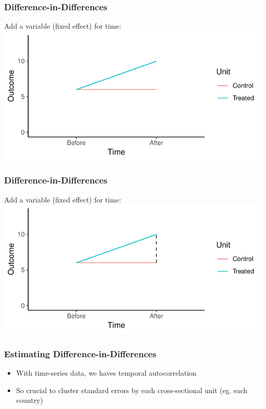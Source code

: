 \documentclass[xcolor=x11names,compress]{beamer}\usepackage[]{graphicx}\usepackage[]{color}
\makeatletter
\def\maxwidth{ %
  \ifdim\Gin@nat@width>\linewidth
    \linewidth
  \else
    \Gin@nat@width
  \fi
}
\newenvironment{knitrout}{}{} %
\renewcommand{\(}{\begin{columns}}
\renewcommand{\)}{\end{columns}}
\newcommand{\<}[1]{\begin{column}{#1}}
\renewcommand{\>}{\end{column}}
\makeatother
\begin{document}
\begin{frame}
\frametitle{Difference-in-Differences}
Add a variable (fixed effect) for time:
\begin{knitrout}
\color{fgcolor}
\includegraphics[width=\maxwidth]{figure/DinD_chart4-1} 

\end{knitrout}
\end{frame}

\begin{frame}
\frametitle{Difference-in-Differences}
Add a variable (fixed effect) for time:
\begin{knitrout}
\color{fgcolor}
\includegraphics[width=\maxwidth]{figure/DinD_chart5-1} 

\end{knitrout}
\end{frame}

\begin{frame}
\frametitle{Estimating Difference-in-Differences}
\begin{itemize}
\item With time-series data, we haves temporal autocorrelation
\pause
\item So crucial to cluster standard errors by each cross-sectional unit (eg. each country)
\end{itemize}
\end{frame}
\end{document}
